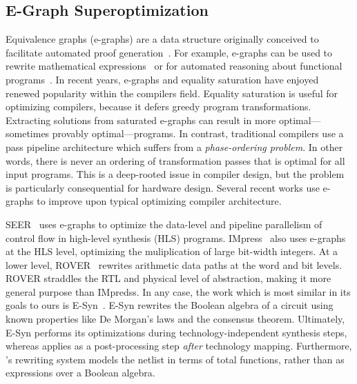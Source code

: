 \subsection{E-Graph Superoptimization}\label{sec:relatedwork:egraph}
Equivalence graphs (e-graphs) are a data structure originally conceived to
facilitate automated proof generation~\cite{eggpaper, eqsat}. For example,
e-graphs can be used to rewrite mathematical expressions~\cite{egraphmath} or
for automated reasoning about functional programs~\cite{cclemma}. In recent
years, e-graphs and equality saturation have enjoyed renewed popularity within
the compilers field. Equality saturation is useful for optimizing compilers,
because it defers greedy program transformations. Extracting solutions from
saturated e-graphs can result in more optimal---sometimes provably
optimal---programs. In contrast, traditional compilers use a pass pipeline
architecture which suffers from a \textit{phase-ordering problem}. In other
words, there is never an ordering of transformation passes that is optimal for
all input programs. This is a deep-rooted issue in compiler design, but the
problem is particularly consequential for hardware design. Several recent works
use e-graphs to improve upon typical optimizing compiler architecture.

SEER~\cite{seer} uses e-graphs to optimize the data-level and pipeline
parallelism of control flow in high-level synthesis (HLS) programs.
IMpress~\cite{impress} also uses e-graphs at the HLS level, optimizing the
muliplication of large bit-width integers. At a lower level,
ROVER~\cite{rover,roverbl,egraphconstraints} rewrites arithmetic data paths at
the word and bit levels. ROVER straddles the RTL and physical level of
abstraction, making it more general purpose than IMpredss. In any case, the
work which is most similar in its goals to ours is E-Syn~\cite{esynth}. E-Syn
rewrites the Boolean algebra of a circuit using known properties like De
Morgan's laws and the consensus theorem. Ultimately, E-Syn performs its
optimizations during technology-independent synthesis steps, whereas
\shortname{} applies as a post-processing step \textit{after} technology
mapping. Furthermore, \shortname{}'s rewriting system models the netlist in
terms of total functions, rather than as expressions over a Boolean algebra.